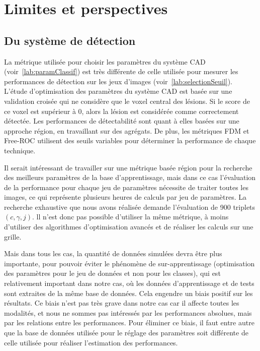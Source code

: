 \section{Limites et perspectives}


\subsection{Du système de détection}

La métrique utilisée pour choisir les paramètres du système CAD
(voir~\ref{lab:paramClassif}) est très différente de celle utilisée pour
mesurer les performances de détection sur les jeux d'images
(voir~\ref{lab:selectionSeuil}). L'étude d'optimisation des paramètres du
système CAD est basée sur une validation croisée qui ne considère que le
voxel central des lésions. Si le score de ce voxel est supérieur à 0,
alors la lésion est considérée comme correctement détectée. Les
performances de détectabilité sont quant à elles basées sur une approche
région, en travaillant sur des agrégats. De plus, les métriques FDM et
Free-ROC utilisent des seuils variables pour déterminer la performance de chaque
technique. 

Il serait intéressant de travailler sur une métrique basée région pour la
recherche des meilleurs paramètres de la base d'apprentissage, mais dans ce cas
l'évaluation de la performance pour chaque jeu de paramètres nécessite de traiter
toutes les images, ce qui représente plusieurs heures de calculs par jeu de
paramètres. La recherche exhaustive que nous avons réalisée demande l'évaluation
de 900 triplets $(c, \gamma, j)$. ll n'est donc pas possible d'utiliser la même
métrique, à moins d'utiliser des algorithmes d'optimisation avancés et de
réaliser les calculs sur une grille. 


Mais dans tous les cas, la quantité de données simulées devra être plus
importante, pour pouvoir éviter le phénomène de sur-apprentissage (optimisation
des paramètres pour le jeu de données et non pour les classes), qui est
relativement important dans notre cas, où les données d'apprentissage et
de tests sont extraites de la même base de données. Cela engendre un biais
positif sur les résultats. Ce biais n'est pas très grave dans notre cas car
il affecte toutes les modalités, et nous ne sommes pas intéressés par les
performances absolues, mais par les relations entre les performances.
Pour éliminer ce biais, il faut entre autre que la base de données utilisée
pour le réglage des paramètres soit différente de celle utilisée pour réaliser
l'estimation des performances.

